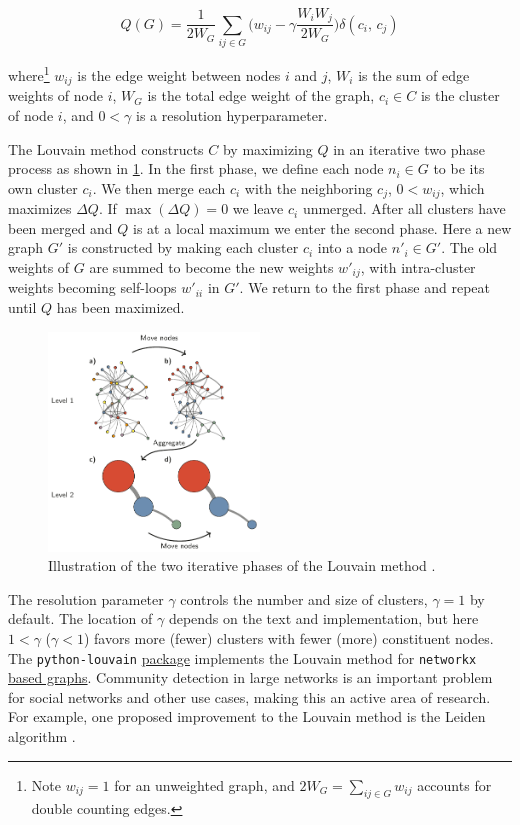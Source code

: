 \begin{equation} \label{eq:unsupervised:louvain:modularity}
Q\left(G\right) = \frac{1}{2 W_{G}} \sum_{ij \in G} \bigg(w_{ij} - \gamma \frac{W_{i} W_{j}}{2 W_{G}}\bigg) \delta\left(c_{i},\,c_{j}\right)
\end{equation}

\noindent where\footnote{Note $w_{ij}=1$ for an unweighted graph, and $2 W_{G} = \sum_{ij \in G} w_{ij}$ accounts for double counting edges.}
$w_{ij}$ is the edge weight between nodes $i$ and $j$,
$W_{i}$ is the sum of edge weights of node $i$,
$W_{G}$ is the total edge weight of the graph,
$c_{i} \in C$ is the cluster of node $i$,
and $0 < \gamma$ is a resolution hyperparameter.

The Louvain method constructs $C$ by maximizing $Q$ in an iterative two phase process as shown in \cref{fig:louvain}.
In the first phase, we define each node $n_{i} \in G$ to be its own cluster $c_{i}$.
We then merge each $c_{i}$ with the neighboring $c_{j}$, $0 < w_{ij}$, which maximizes $\Delta Q$.
If $\max\left(\Delta Q\right) = 0$ we leave $c_{i}$ unmerged.
After all clusters have been merged and $Q$ is at a local maximum we enter the second phase.
Here a new graph $G'$ is constructed by making each cluster $c_{i}$ into a node $n'_{i} \in G'$.
The old weights of $G$ are summed to become the new weights $w'_{ij}$,
with intra-cluster weights becoming self-loops $w'_{ii}$ in $G'$.
We return to the first phase and repeat until $Q$ has been maximized.

\begin{figure}
\centering
\includegraphics[width=0.5\textwidth]{figures/ml/louvain_algo}
\caption{
Illustration of the two iterative phases of the Louvain method \cite{leiden}.
}
\label{fig:louvain}
\end{figure}

The resolution parameter $\gamma$ controls the number and size of clusters, $\gamma =1$ by default.
The location of $\gamma$ depends on the text and implementation,
but here $1 < \gamma$ ($\gamma < 1$) favors more (fewer) clusters with fewer (more) constituent nodes.
The \texttt{python-louvain}
\href{https://python-louvain.readthedocs.io/en/latest/}{package} \cite{python-louvain}
implements the Louvain method for \texttt{networkx} \cite{networkx}
\href{https://networkx.org/}{based graphs}.
Community detection in large networks is an important problem for social networks and other use cases,
making this an active area of research.
For example, one proposed improvement to the Louvain method is the Leiden algorithm \cite{leiden}.

